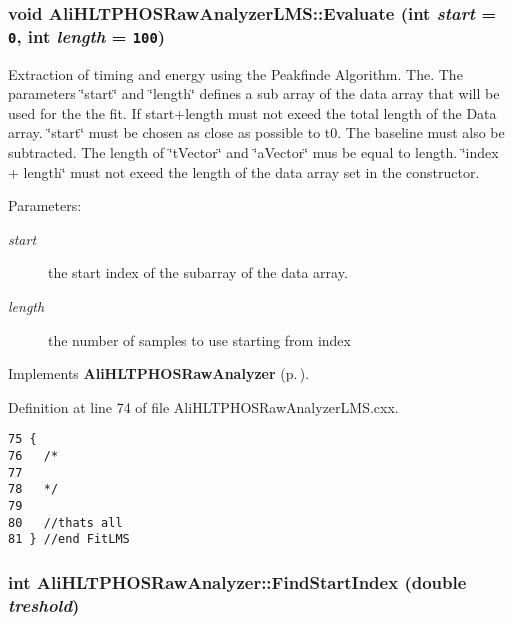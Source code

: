 \subsubsection{\setlength{\rightskip}{0pt plus 5cm}void Ali\-HLTPHOSRaw\-Analyzer\-LMS::Evaluate (int {\em start} = {\tt 0}, int {\em length} = {\tt 100})\hspace{0.3cm}{\tt  [virtual]}}\label{classAliHLTPHOSRawAnalyzerLMS_AliHLTPHOSRawAnalyzerLMSa5}


Extraction of timing and energy using the Peakfinde Algorithm. The. The parameters \char`\"{}start\char`\"{} and \char`\"{}length\char`\"{} defines a sub array of the data array that will be used for the the fit. If start+length must not exeed the total length of the Data array. \char`\"{}start\char`\"{} must be chosen as close as possible to t0. The baseline must also be subtracted. The length of \char`\"{}t\-Vector\char`\"{} and \char`\"{}a\-Vector\char`\"{} mus be equal to length. \char`\"{}index + length\char`\"{} must not exeed the length of the data array set in the constructor. \begin{Desc}
\item[Parameters:]
\begin{description}
\item[{\em start}]the start index of the subarray of the data array. \item[{\em length}]the number of samples to use starting from index \end{description}
\end{Desc}


Implements {\bf Ali\-HLTPHOSRaw\-Analyzer} {\rm (p.\,\pageref{classAliHLTPHOSRawAnalyzer_AliHLTPHOSRawAnalyzera14})}.

Definition at line 74 of file Ali\-HLTPHOSRaw\-Analyzer\-LMS.cxx.

\footnotesize\begin{verbatim}75 {
76   /*
77 
78   */
79 
80   //thats all 
81 } //end FitLMS
\end{verbatim}\normalsize 


\subsubsection{\setlength{\rightskip}{0pt plus 5cm}int Ali\-HLTPHOSRaw\-Analyzer::Find\-Start\-Index (double {\em treshold})\hspace{0.3cm}{\tt  [inherited]}}\label{classAliHLTPHOSRawAnalyzer_AliHLTPHOSRawAnalyzerPeakFindera9}




